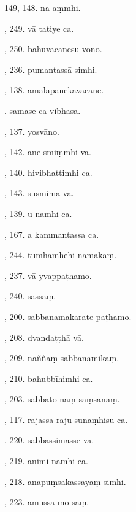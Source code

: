 149, 148. na aṃmhi.\hfill \pageref{sut:149}\par {}, 249. vā tatiye ca.\hfill \pageref{sut:150}\par {}, 250. bahuvacanesu vono.\hfill \pageref{sut:151}\par {}, 236. pumantassā simhi.\hfill \pageref{sut:152}\par {}, 138. amālapanekavacane.\hfill \pageref{sut:153}\par {}. samāse ca vibhāsā.\hfill \pageref{sut:154}\par {}, 137. yosvāno.\hfill \pageref{sut:155}\par {}, 142. āne smiṃmhi vā.\hfill \pageref{sut:156}\par {}, 140. hivibhattimhi ca.\hfill \pageref{sut:157}\par {}, 143. susmimā vā.\hfill \pageref{sut:158}\par {}, 139. u nāmhi ca.\hfill \pageref{sut:159}\par {}, 167. a kammantassa ca.\hfill \pageref{sut:160}\par {}, 244. tumhamhehi namākaṃ.\hfill \pageref{sut:161}\par {}, 237. vā yvappaṭhamo.\hfill \pageref{sut:162}\par {}, 240. sassaṃ.\hfill \pageref{sut:163}\par {}, 200. sabbanāmakārate paṭhamo.\hfill \pageref{sut:164}\par {}, 208. dvandaṭṭhā vā.\hfill \pageref{sut:165}\par {}, 209. nāññaṃ sabbanāmikaṃ.\hfill \pageref{sut:166}\par {}, 210. bahubbīhimhi ca.\hfill \pageref{sut:167}\par {}, 203. sabbato naṃ saṃsānaṃ.\hfill \pageref{sut:168}\par {}, 117. rājassa rāju sunaṃhisu ca.\hfill \pageref{sut:169}\par {}, 220. sabbassimasse vā.\hfill \pageref{sut:170}\par {}, 219. animi nāmhi ca.\hfill \pageref{sut:171}\par {}, 218. anapuṃsakassāyaṃ simhi.\hfill \pageref{sut:172}\par {}, 223. amussa mo saṃ.\hfill \pageref{sut:173}\par \noindent
